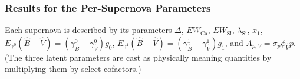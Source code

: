 \documentclass[trackchanges]{aastex62}   	%
\begin{document}
\subsubsection{Results for the Per-Supernova Parameters}
\label{results3per:sec}
Each supernova is described by its parameters $\Delta$, $EW_{\mathrm{Ca}}$, $EW_{\mathrm{Si}}$, $\lambda_{\mathrm{Si}}$, $x_1$,
$E_{\gamma^0}({\hat{B}}-{\hat{V}})=(\gamma^0_{\hat{B}}-\gamma^0_{\hat{V}})g_0$, $E_{\gamma^1}({\hat{B}}-{\hat{V}})=(\gamma^1_{\hat{B}}-\gamma^1_{\hat{V}})g_1$, and $A_{p,V} =  \sigma_p\phi_{\hat{V}}p$.  (The  three latent parameters are cast as physically meaning
quantities by multiplying them by select cofactors.)
\end{document}
